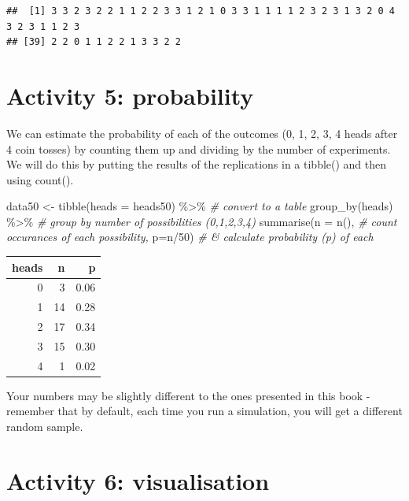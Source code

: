 \documentclass[
  oneside]{book}
\newenvironment{Shaded}{\begin{snugshade}}{\end{snugshade}}
\newcommand{\AttributeTok}[1]{\textcolor[rgb]{0.77,0.63,0.00}{#1}}
\newcommand{\CommentTok}[1]{\textcolor[rgb]{0.56,0.35,0.01}{\textit{#1}}}
\newcommand{\DecValTok}[1]{\textcolor[rgb]{0.00,0.00,0.81}{#1}}
\newcommand{\FunctionTok}[1]{\textcolor[rgb]{0.00,0.00,0.00}{#1}}
\newcommand{\NormalTok}[1]{#1}
\newcommand{\OtherTok}[1]{\textcolor[rgb]{0.56,0.35,0.01}{#1}}
\newcommand{\SpecialCharTok}[1]{\textcolor[rgb]{0.00,0.00,0.00}{#1}}
\begin{document}
\begin{verbatim}
##  [1] 3 3 2 3 2 2 1 1 2 2 3 3 1 2 1 0 3 3 1 1 1 1 2 3 2 3 1 3 2 0 4 3 2 3 1 1 2 3
## [39] 2 2 0 1 1 2 2 1 3 3 2 2
\end{verbatim}

\hypertarget{activity-5-probability}{%
\section{Activity 5: probability}\label{activity-5-probability}}

We can estimate the probability of each of the outcomes (0, 1, 2, 3, 4 heads after 4 coin tosses) by counting them up and dividing by the number of experiments. We will do this by putting the results of the replications in a tibble() and then using count().

\begin{Shaded}
\begin{Highlighting}[]
\NormalTok{data50 }\OtherTok{\textless{}{-}} \FunctionTok{tibble}\NormalTok{(}\AttributeTok{heads =}\NormalTok{ heads50) }\SpecialCharTok{\%\textgreater{}\%}   \CommentTok{\# convert to a table}
                \FunctionTok{group\_by}\NormalTok{(heads) }\SpecialCharTok{\%\textgreater{}\%}   \CommentTok{\# group by number of possibilities (0,1,2,3,4)}
                \FunctionTok{summarise}\NormalTok{(}\AttributeTok{n =} \FunctionTok{n}\NormalTok{(), }\CommentTok{\# count occurances of each possibility,}
                          \AttributeTok{p=}\NormalTok{n}\SpecialCharTok{/}\DecValTok{50}\NormalTok{) }\CommentTok{\# \& calculate probability (p) of each}
\end{Highlighting}
\end{Shaded}

\begin{tabular}{r|r|r}
\hline
heads & n & p\\
\hline
0 & 3 & 0.06\\
\hline
1 & 14 & 0.28\\
\hline
2 & 17 & 0.34\\
\hline
3 & 15 & 0.30\\
\hline
4 & 1 & 0.02\\
\hline
\end{tabular}

Your numbers may be slightly different to the ones presented in this book - remember that by default, each time you run a simulation, you will get a different random sample.

\hypertarget{activity-6-visualisation}{%
\section{Activity 6: visualisation}\label{activity-6-visualisation}}
\end{document}
